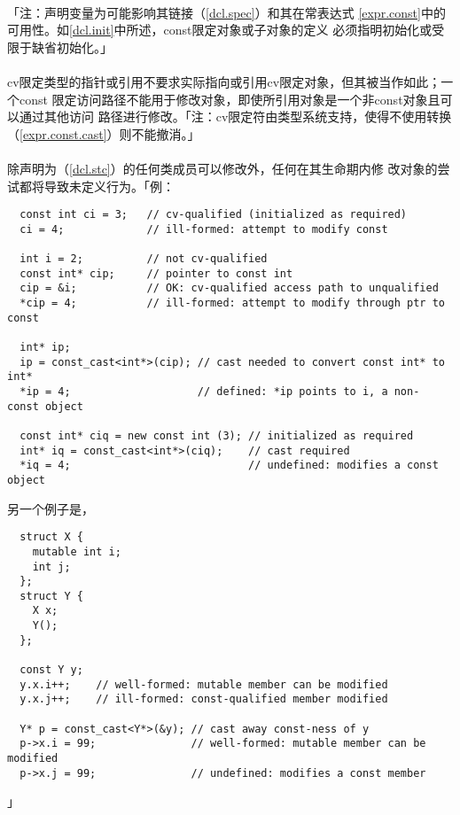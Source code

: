 \paragraph{}
「注：声明变量为可能影响其链接（\ref{dcl.spec}）和其在常表达式
\ref{expr.const}中的可用性。如\ref{dcl.init}中所述，const限定对象或子对象的定义
必须指明初始化或受限于缺省初始化。」

\paragraph{}
cv限定类型的指针或引用不要求实际指向或引用cv限定对象，但其被当作如此；一个const
限定访问路径不能用于修改对象，即使所引用对象是一个非const对象且可以通过其他访问
路径进行修改。「注：cv限定符由类型系统支持，使得不使用转换
（\ref{expr.const.cast}）则不能撤消。」

\paragraph{}
除声明为（\ref{dcl.stc}）的任何类成员可以修改外，任何在其生命期内修
改对象的尝试都将导致未定义行为。「例：
\begin{lstlisting}
  const int ci = 3;   // cv-qualified (initialized as required)
  ci = 4;             // ill-formed: attempt to modify const

  int i = 2;          // not cv-qualified
  const int* cip;     // pointer to const int
  cip = &i;           // OK: cv-qualified access path to unqualified
  *cip = 4;           // ill-formed: attempt to modify through ptr to const

  int* ip;
  ip = const_cast<int*>(cip); // cast needed to convert const int* to int*
  *ip = 4;                    // defined: *ip points to i, a non- const object

  const int* ciq = new const int (3); // initialized as required
  int* iq = const_cast<int*>(ciq);    // cast required
  *iq = 4;                            // undefined: modifies a const object
\end{lstlisting}
另一个例子是，
\begin{lstlisting}
  struct X {
    mutable int i;
    int j;
  };
  struct Y {
    X x;
    Y();
  };

  const Y y;
  y.x.i++;    // well-formed: mutable member can be modified
  y.x.j++;    // ill-formed: const-qualified member modified

  Y* p = const_cast<Y*>(&y); // cast away const-ness of y
  p->x.i = 99;               // well-formed: mutable member can be modified
  p->x.j = 99;               // undefined: modifies a const member
\end{lstlisting}」

